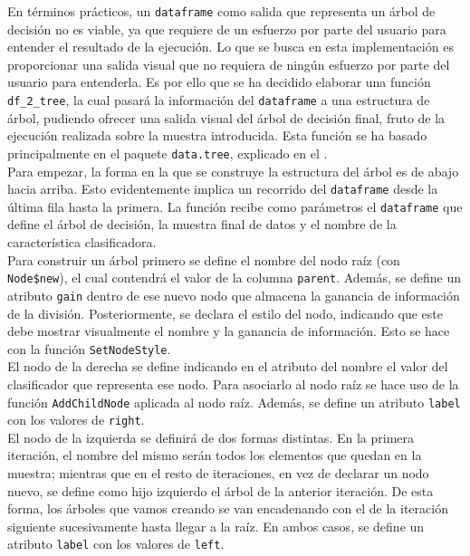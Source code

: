 \documentclass[12pt]{report}\usepackage[]{graphicx}\usepackage[dvipsnames]{xcolor}
\begin{document}
	 			En términos prácticos, un \texttt{dataframe} como salida que representa un árbol de decisión no es viable, ya que requiere de un esfuerzo por parte del usuario para entender el resultado de la ejecución. Lo que se busca en esta implementación es proporcionar una salida visual que no requiera de ningún esfuerzo por parte del usuario para entenderla. Es por ello que se ha decidido elaborar una función \texttt{df\_2\_tree}, la cual pasará la información del \texttt{dataframe} a una estructura de árbol, pudiendo ofrecer una salida visual del árbol de decisión final, fruto de la ejecución realizada sobre la muestra introducida. Esta función se ha basado principalmente en el paquete \texttt{data.tree}, explicado en el .\\
	 			
	 			Para empezar, la forma en la que se construye la estructura del árbol es de abajo hacia arriba. Esto evidentemente implica un recorrido del \texttt{dataframe} desde la última fila hasta la primera. La función recibe como parámetros el \texttt{dataframe} que define el árbol de decisión, la muestra final de datos y el nombre de la característica clasificadora.\\
	 			
	 			Para construir un árbol primero se define el nombre del nodo raíz (con \texttt{Node\$new}), el cual contendrá el valor de la columna \texttt{parent}. Además, se define un atributo \texttt{gain} dentro de ese nuevo nodo que almacena la ganancia de información de la división. Posteriormente, se declara el estilo del nodo, indicando que este debe mostrar visualmente el nombre y la ganancia de información. Esto se hace con la función \texttt{SetNodeStyle}.\\
	 			
	 			El nodo de la derecha se define indicando en el atributo del nombre el valor del clasificador que representa ese nodo. Para asociarlo al nodo raíz se hace uso de la función \texttt{AddChildNode} aplicada al nodo raíz. Además, se define un atributo \texttt{label} con los valores de \texttt{right}.\\
	 			
	 			El nodo de la izquierda se definirá de dos formas distintas. En la primera iteración, el nombre del mismo serán todos los elementos que quedan en la muestra; mientras que en el resto de iteraciones, en vez de declarar un nodo nuevo, se define como hijo izquierdo el árbol de la anterior iteración. De esta forma, los árboles que vamos creando se van encadenando con el de la iteración siguiente sucesivamente hasta llegar a la raíz. En ambos casos, se define un atributo \texttt{label} con los valores de \texttt{left}.\\
	 			
\end{document}
